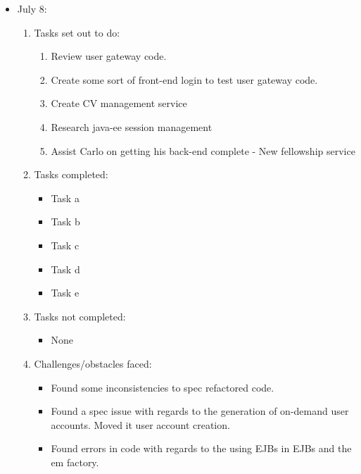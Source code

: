 \documentclass[12pt]{article}
\begin{document}
	\begin{itemize}
		\item July 8:
		\begin{enumerate}
			\item Tasks set out to do:
			\begin{enumerate}
				\item Review user gateway code.
				\item Create some sort of front-end login to test user gateway code.
				\item Create CV management service 
				\item Research java-ee session management
				\item Assist Carlo on getting his back-end complete - New fellowship service
			\end{enumerate}
			\item Tasks completed:
			\begin{itemize}
				\item Task a
				\item Task b
				\item Task c
				\item Task d
				\item Task e
			\end{itemize}
			\item Tasks not completed:
			\begin{itemize}
				\item None
			\end{itemize}
			\item Challenges/obstacles faced:
			\begin{itemize}
				\item Found some inconsistencies to spec refactored code. 
				\item Found a spec issue with regards to the generation of on-demand user accounts. Moved it user account creation.
				\item Found errors in code with regards to the using EJBs in EJBs and the em factory.
			\end{itemize}			
		\end{enumerate}
	\end{itemize}
	
\end{document}
